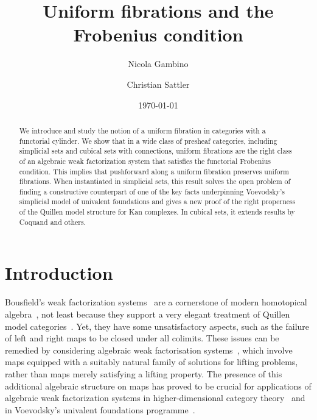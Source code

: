 \documentclass[reqno,10pt,a4paper,oneside,draft]{amsart}
\title{Uniform fibrations and the Frobenius condition}
\begin{document}
\begin{abstract}
We introduce and study the notion of a uniform fibration in categories with a functorial cylinder.
We show that in a wide class of presheaf categories, including simplicial sets and cubical sets with connections, uniform fibrations are the right class of an algebraic weak factorization system that satisfies the functorial Frobenius condition.
This implies that pushforward along a uniform fibration preserves uniform fibrations.
When instantiated in simplicial sets, this result solves the open problem of finding a constructive counterpart of one of the key facts underpinning Voevodsky's simplicial model of univalent foundations and gives a new proof of the right properness of the Quillen model structure for Kan complexes.
In cubical sets, it extends results by Coquand and others.
\end{abstract}

\author{Nicola Gambino}
\address{School of Mathematics, University of Leeds, Leeds LS2 9JT, UK}

\author{Christian Sattler}
\address{School of Mathematics, University of Leeds, Leeds LS2 9JT, UK}

\date{\today}

\maketitle


\section*{Introduction}

Bousfield's weak factorization systems~\cite{bousfield-wfs} are a cornerstone of modern homotopical algebra~\cite{quillen-homotopical}, not least because they support a very elegant treatment of Quillen model categories~\cite{joyal-tierney-notes}.
Yet, they have some unsatisfactory aspects, such as the failure of left and right maps to be closed under all colimits.
These issues can be remedied by considering algebraic weak factorisation systems~\cite{garner:small-object-argument,grandis-tholen-nwfs}, which involve maps equipped with a suitably natural family of solutions for lifting problems, rather than maps merely satisfying a lifting property.
The presence of this additional algebraic structure on maps has proved to be crucial for applications of algebraic weak factorization systems in higher-dimensional category theory~\cite{batanin-cisinski-weber,garner:globular-operator-awfs,garner-homomorphisms} and in Voevodsky's univalent foundations programme~\cite{awodey-cubical,coquand-cubical-sets,cohen-et-al:cubicaltt,pitts-cubical-nominal,swan-awfs}.
\end{document}
